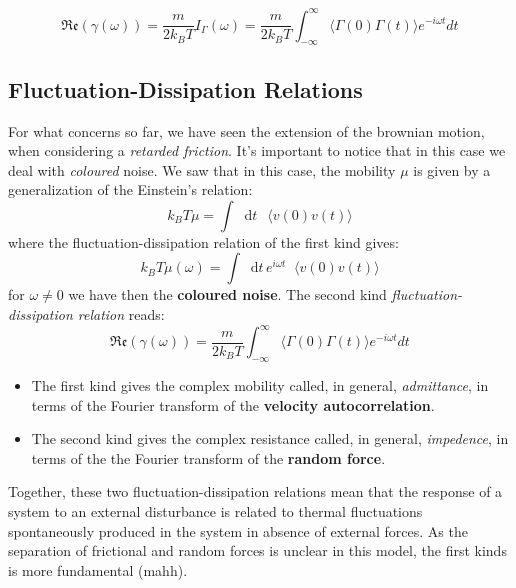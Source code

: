 \documentclass{article}
\newcommand*\diff{\mathop{}\!\mathrm{d}}
\newcommand*\mean[1]{\mathop{}\!\langle#1 \rangle }
\begin{document}
\begin{equation}
\mathfrak{Re}(\gamma(\omega)) = \frac{m}{2 k_B T} I_{\Gamma}(\omega) = \frac{m}{2 k_B T} \int_{- \infty}^{\infty} \langle \Gamma(0) \Gamma(t) \rangle e^{-i \omega t} dt
\label{fdsecond}
\end{equation}


\subsection{Fluctuation-Dissipation Relations}
For what concerns so far, we have seen the extension of the brownian motion, when considering a \textit{retarded friction}. It's important to notice that in this case we deal with \textit{coloured} noise. We saw that in this case, the mobility $\mu$ is given by a generalization of the Einstein's relation:
$$k_B T \mu =  \int \diff{t} \, \mean{v(0)v(t)}$$
where the fluctuation-dissipation relation of the first kind gives:
$$k_B T \mu(\omega ) = \int \diff{t} \,e^{i\omega t} \mean{v(0)v(t)} $$
for $\omega \neq 0$ we have then the \textbf{coloured noise}.
The second kind \textit{fluctuation-dissipation relation} reads:
$$ \mathfrak{Re}(\gamma(\omega))  = \frac{m}{2 k_B T} \int_{- \infty}^{\infty} \langle \Gamma(0) \Gamma(t) \rangle e^{-i \omega t} dt$$
\begin{itemize}
    \item The first kind gives the complex mobility called, in general, \emph{admittance}, in terms of the Fourier transform of the \textbf{velocity autocorrelation}.
\item The second kind gives the complex resistance called, in general, \emph{impedence}, in terms of the the Fourier transform of the \textbf{random force}.
\end{itemize}

Together, these two fluctuation-dissipation relations mean that the response of a system to an external disturbance is related to thermal fluctuations spontaneously produced in the system in absence of external forces. As the separation of frictional and random forces is unclear in this model, the first kinds is more fundamental (mahh).
\end{document}
